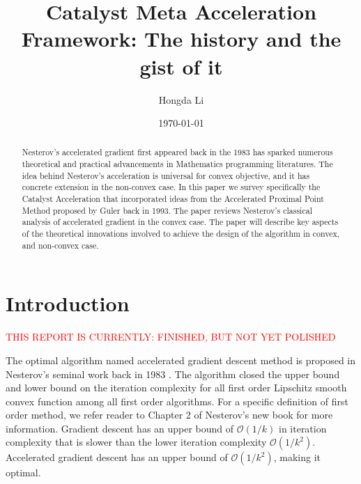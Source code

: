 \documentclass[12pt]{article}
\begin{document}
\title{
    {
        \selectfont 
        Catalyst Meta Acceleration Framework: The history and the gist of it
    }
    }

\author{
    Hongda Li
}

\date{\today}

\maketitle


\begin{abstract} 
    \noindent
    Nesterov's accelerated gradient first appeared back in the 1983 has sparked numerous theoretical and practical advancements in Mathematics programming literatures. 
    The idea behind Nesterov's acceleration is universal for convex objective, and it has concrete extension in the non-convex case. 
    In this paper we survey specifically the Catalyst Acceleration that incorporated ideas from the Accelerated Proximal Point Method proposed by Guler back in 1993. 
    The paper reviews Nesterov's classical analysis of accelerated gradient in the convex case.
    The paper will describe key aspects of the theoretical innovations involved to achieve the design of the algorithm in convex, and non-convex case. 
    
\end{abstract}


\section{Introduction}
    \textcolor{red}{THIS REPORT IS CURRENTLY: FINISHED, BUT NOT YET POLISHED}

    The optimal algorithm named accelerated gradient descent method is proposed in Nesterov's seminal work back in 1983 \cite{nesterov_method_1983}. 
    The algorithm closed the upper bound and lower bound on the iteration complexity for all first order Lipschitz smooth convex function among all first order algorithms. 
    For a specific definition of first order method, we refer reader to Chapter 2 of Nesterov's new book \cite{nesterov_lectures_2018} for more information. 
    Gradient descent has an upper bound of $\mathcal O(1/k)$ in iteration complexity that is slower than
    the lower iteration complexity $\mathcal O(1/k^2)$. 
    Accelerated gradient descent has an upper bound of $\mathcal O(1/k^2)$, making it optimal. 
\end{document}
